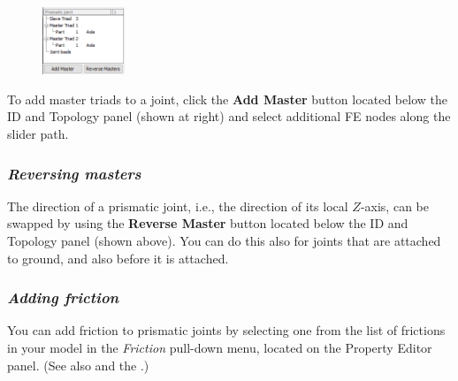 \begin{figure}
  \vspace{-8mm}
  \center
  \includegraphics[width=0.22\textwidth]{Figures/4-PrismJoint-topology}
\end{figure}

To add master triads to a joint, click the \textbf{Add Master} button
located below the ID and Topology panel (shown at right) and select
additional FE nodes along the slider path.

\medskip
{}

\subsubsection{\sl\textbf{Reversing masters}}

The direction of a prismatic joint, i.e., the direction of its local $Z$-axis,
can be swapped by using the \textbf{Reverse Master} button located below
the ID and Topology panel (shown above). You can do this also for joints that
are attached to ground, and also before it is attached.

\subsubsection{\sl\textbf{Adding friction}}

You can add friction to prismatic joints by selecting one from the list of
frictions in your model in the {\sl Friction} pull-down menu, located on
the Property Editor panel. (See also 
and the .)




